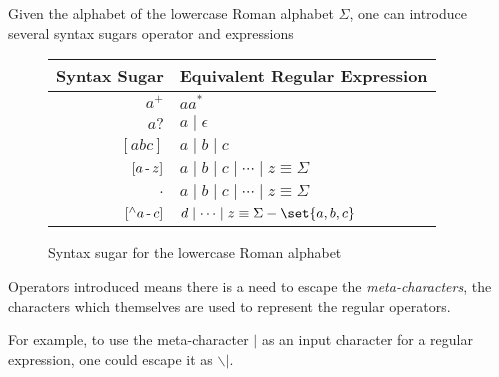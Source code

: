 \begin{example}
    Given the alphabet of the lowercase Roman alphabet $\Sigma$, one can introduce several syntax sugars operator and expressions
    \begin{figure}[H]
        \centering
        \begin{tabular}{@{} r | l @{}}
            \toprule
            Syntax Sugar & Equivalent Regular Expression \\
            \midrule
            $a^+$ & $aa^\ast$  \\
            $a?$ & $a \mid \epsilon$ \\
            $[abc]$ & $a \mid b \mid c$ \\
            $[a \operatorname{-} z]$ & 
                $a \mid b \mid c \mid \cdots \mid z \equiv \Sigma$ \\
            $.$ & 
                $a \mid b \mid c \mid \cdots \mid z \equiv \Sigma$ \\
            $[^{\wedge} a \operatorname{-} c]$ & 
                $d \mid \cdots \mid z \equiv \Sigma - \set{a, b, c}$ \\
            \bottomrule
        \end{tabular}
        \caption{Syntax sugar for the lowercase Roman alphabet}
        \label{fig:roman-syntax-sugar}
    \end{figure}
\end{example}

\begin{remark}
    Operators introduced means there is a need to escape the \textit{meta-characters}, the characters which themselves are used to represent the regular operators.
    
    For example, to use the meta-character $\mid$ as an input character for a regular expression, one could escape it as $\backslash\vert$.
\end{remark}

